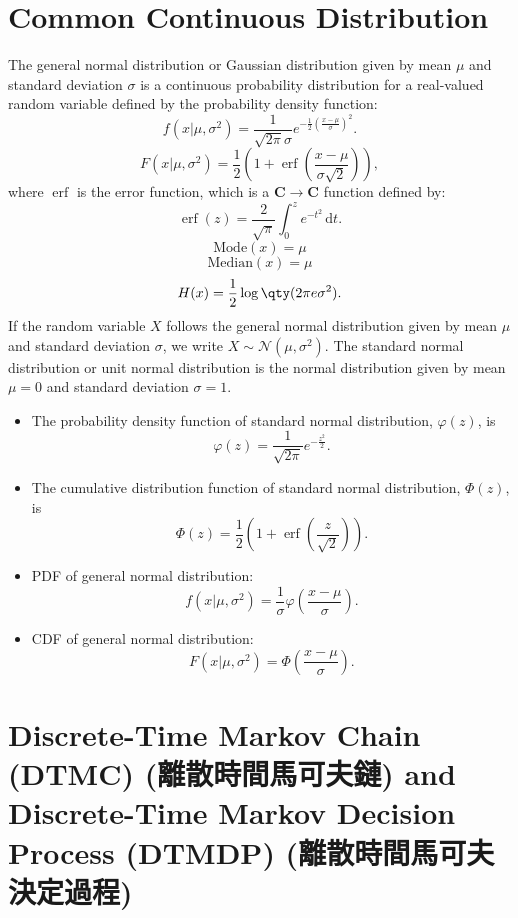\documentclass[a4paper,12pt]{report}
\begin{document}
\section{Common Continuous Distribution}
The general normal distribution or Gaussian distribution given by mean $\mu$ and standard deviation $\sigma$ is a continuous probability distribution for a real-valued random variable defined by the probability density function:
\[f(x|\mu,\sigma^2)=\frac{1}{\sqrt{2\pi}\sigma}e^{-\frac{1}{2}\left(\frac{x-\mu}{\sigma}\right)^2}.\]
\[F(x|\mu,\sigma^2)=\frac{1}{2}\left(1+\operatorname{erf}\left(\frac{x-\mu}{\sigma\sqrt{2}}\right)\right),\]
where $\operatorname{erf}$ is the error function, which is a $\mathbf{C}\to\mathbf{C}$ function defined by:
\[\operatorname{erf}(z)=\frac{2}{\sqrt{\pi}}\int_0^ze^{-t^2}\,\mathrm{d}t.\]
\[\text{Mode}(x)=\mu\]
\[\text{Median}(x)=\mu\]
\[H(x)=\frac{1}{2}\log\qty(2\pi e\sigma^2).\]
If the random variable $X$ follows the general normal distribution given by mean $\mu$ and standard deviation $\sigma$, we write $X\sim\mathcal{N}(\mu,\sigma^2)$.
The standard normal distribution or unit normal distribution is the normal distribution given by mean $\mu=0$ and standard deviation $\sigma=1$.
\begin{itemize}
\item The probability density function of standard normal distribution, $\varphi(z)$, is
\[\varphi(z)=\frac{1}{\sqrt{2\pi}}e^{-\frac{z^2}{2}}.\]
\item The cumulative distribution function of standard normal distribution, $\Phi(z)$, is
\[\Phi(z)=\frac{1}{2}\left(1+\operatorname{erf}\left(\frac{z}{\sqrt{2}}\right)\right).\]
\item PDF of general normal distribution:
\[f(x|\mu,\sigma^2)=\frac{1}{\sigma}\varphi\left(\frac{x-\mu}{\sigma}\right).\]
\item CDF of general normal distribution:
\[F(x|\mu,\sigma^2)=\Phi\left(\frac{x-\mu}{\sigma}\right).\]
\end{itemize}
\section{Discrete-Time Markov Chain (DTMC) (離散時間馬可夫鏈) and Discrete-Time Markov Decision Process (DTMDP) (離散時間馬可夫決定過程)}
\end{document}
